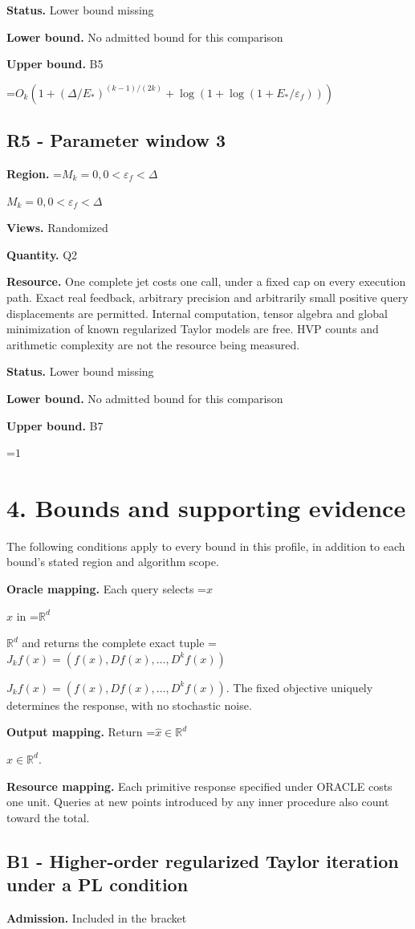 \documentclass[10pt,a4paper]{article}
\newcommand{\AtlasMath}[1]{\par\begingroup\centering\setbox0=\hbox{$\displaystyle #1$}\ifdim\wd0>1.4\linewidth\typeout{ATLAS WIDE FORMULA: \the\wd0}\fi\ifdim\wd0>\linewidth\resizebox{\linewidth}{!}{\box0}\else\box0\fi\par\endgroup}
\newcommand{\AtlasInlineMath}[1]{\begingroup\setbox0=\hbox{$#1$}\ifdim\wd0>.4\linewidth\endgroup\AtlasMath{#1}\else\endgroup$#1$\fi}
\begin{document}
\textbf{Status.} Lower bound missing

\textbf{Lower bound.} No admitted bound for this comparison

\textbf{Upper bound.} B5

\AtlasMath{O_k(1+(\Delta/E_*)^{(k-1)/(2k)}+\log(1+\log(1+E_*/\varepsilon_f)))}
\subsection{R5 - Parameter window 3}
\textbf{Region.} \AtlasInlineMath{M_k=0,0<\varepsilon_f<\Delta}

\textbf{Views.} Randomized

\textbf{Quantity.} Q2

\textbf{Resource.} One complete jet costs one call, under a fixed cap on every execution path. Exact real feedback, arbitrary precision and arbitrarily small positive query displacements are permitted. Internal computation, tensor algebra and global minimization of known regularized Taylor models are free. HVP counts and arithmetic complexity are not the resource being measured.

\textbf{Status.} Lower bound missing

\textbf{Lower bound.} No admitted bound for this comparison

\textbf{Upper bound.} B7

\AtlasMath{1}
\section{4. Bounds and supporting evidence}
The following conditions apply to every bound in this profile, in addition to each bound's stated region and algorithm scope.

\textbf{Oracle mapping.} Each query selects \AtlasInlineMath{x} in \AtlasInlineMath{\mathbb{R}^d} and returns the complete exact tuple \AtlasInlineMath{J_{k}f(x)=(f(x),Df(x),\ldots,D^{k}f(x))}. The fixed objective uniquely determines the response, with no stochastic noise.

\textbf{Output mapping.} Return \AtlasInlineMath{\widehat{x}\in \mathbb{R}^d}.

\textbf{Resource mapping.} Each primitive response specified under ORACLE costs one unit. Queries at new points introduced by any inner procedure also count toward the total.

\subsection{B1 - Higher-order regularized Taylor iteration under a PL condition}
\textbf{Admission.} Included in the bracket
\end{document}
